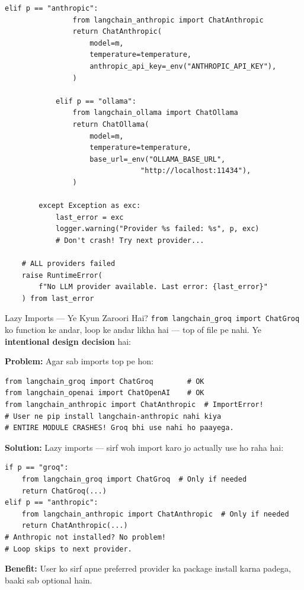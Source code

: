 \documentclass[11pt,a4paper,twoside]{report}
\begin{document}
\begin{lstlisting}[style=pythonstyle,caption={The most critical function in providers.py}]
            elif p == "anthropic":
                from langchain_anthropic import ChatAnthropic
                return ChatAnthropic(
                    model=m,
                    temperature=temperature,
                    anthropic_api_key=_env("ANTHROPIC_API_KEY"),
                )

            elif p == "ollama":
                from langchain_ollama import ChatOllama
                return ChatOllama(
                    model=m,
                    temperature=temperature,
                    base_url=_env("OLLAMA_BASE_URL",
                                "http://localhost:11434"),
                )

        except Exception as exc:
            last_error = exc
            logger.warning("Provider %s failed: %s", p, exc)
            # Don't crash! Try next provider...

    # ALL providers failed
    raise RuntimeError(
        f"No LLM provider available. Last error: {last_error}"
    ) from last_error
\end{lstlisting}

\begin{warningbox}{Lazy Imports --- Ye Kyun Zaroori Hai?}
\texttt{from langchain\_groq import ChatGroq} ko function ke andar, loop ke andar likha hai --- top of file pe nahi. Ye \textbf{intentional design decision} hai:

\textbf{Problem:} Agar sab imports top pe hon:
\begin{lstlisting}[style=pythonstyle]
from langchain_groq import ChatGroq        # OK
from langchain_openai import ChatOpenAI    # OK
from langchain_anthropic import ChatAnthropic  # ImportError!
# User ne pip install langchain-anthropic nahi kiya
# ENTIRE MODULE CRASHES! Groq bhi use nahi ho paayega.
\end{lstlisting}

\textbf{Solution:} Lazy imports --- sirf woh import karo jo actually use ho raha hai:
\begin{lstlisting}[style=pythonstyle]
if p == "groq":
    from langchain_groq import ChatGroq  # Only if needed
    return ChatGroq(...)
elif p == "anthropic":
    from langchain_anthropic import ChatAnthropic  # Only if needed
    return ChatAnthropic(...)
# Anthropic not installed? No problem!
# Loop skips to next provider.
\end{lstlisting}

\textbf{Benefit:} User ko sirf apne preferred provider ka package install karna padega, baaki sab optional hain.
\end{warningbox}
\end{document}
